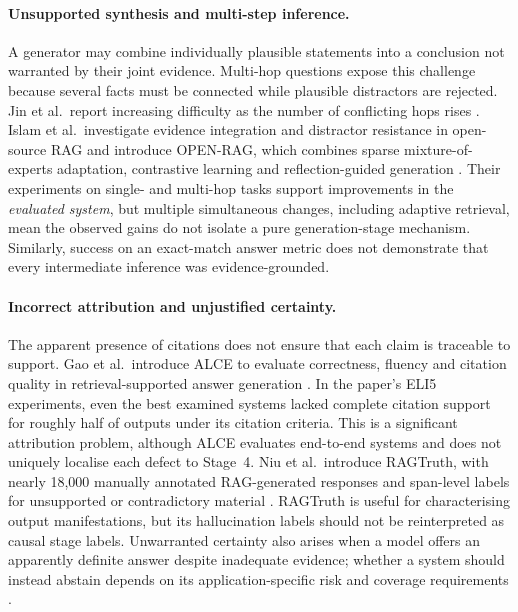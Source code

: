 \paragraph{Unsupported synthesis and multi-step inference.}
A generator may combine individually plausible statements into a conclusion not warranted by their joint evidence. Multi-hop questions expose this challenge because several facts must be connected while plausible distractors are rejected. Jin et al.\ report increasing difficulty as the number of conflicting hops rises \cite[Sec.~4]{jin2024tug}. Islam et al.\ investigate evidence integration and distractor resistance in open-source RAG and introduce OPEN-RAG, which combines sparse mixture-of-experts adaptation, contrastive learning and reflection-guided generation \cite[Secs.~2--4]{islam2024openrag}. Their experiments on single- and multi-hop tasks support improvements in the \emph{evaluated system}, but multiple simultaneous changes, including adaptive retrieval, mean the observed gains do not isolate a pure generation-stage mechanism. Similarly, success on an exact-match answer metric does not demonstrate that every intermediate inference was evidence-grounded.

\paragraph{Incorrect attribution and unjustified certainty.}
The apparent presence of citations does not ensure that each claim is traceable to support. Gao et al.\ introduce ALCE to evaluate correctness, fluency and citation quality in retrieval-supported answer generation \cite[Secs.~2--4]{gao2023alce}. In the paper's ELI5 experiments, even the best examined systems lacked complete citation support for roughly half of outputs under its citation criteria. This is a significant attribution problem, although ALCE evaluates end-to-end systems and does not uniquely localise each defect to Stage~4. Niu et al.\ introduce RAGTruth, with nearly 18,000 manually annotated RAG-generated responses and span-level labels for unsupported or contradictory material \cite[Secs.~2--3]{niu2024ragtruth}. RAGTruth is useful for characterising output manifestations, but its hallucination labels should not be reinterpreted as causal stage labels. Unwarranted certainty also arises when a model offers an apparently definite answer despite inadequate evidence; whether a system should instead abstain depends on its application-specific risk and coverage requirements \cite{joren2025sufficient}.


